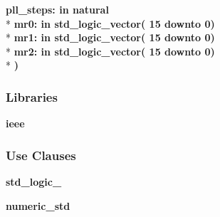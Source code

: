 \begin{DoxyCompactItemize}
{\bfseries \textcolor{vhdlchar}{pll\+\_\+steps\+: }\textcolor{stringliteral}{in }{\bfseries \textcolor{comment}{natural}\textcolor{vhdlchar}{ }}}\\*
{\bfseries \textcolor{vhdlchar}{mr0\+: }\textcolor{stringliteral}{in }\textcolor{vhdlchar}{std\+\_\+logic\+\_\+vector( 15 downto  0)}}\\*
{\bfseries \textcolor{vhdlchar}{mr1\+: }\textcolor{stringliteral}{in }\textcolor{vhdlchar}{std\+\_\+logic\+\_\+vector( 15 downto  0)}}\\*
{\bfseries \textcolor{vhdlchar}{mr2\+: }\textcolor{stringliteral}{in }\textcolor{vhdlchar}{std\+\_\+logic\+\_\+vector( 15 downto  0)}}\\*
{\bfseries  )} 
\end{DoxyCompactItemize}
\subsubsection*{Libraries}
 \begin{DoxyCompactItemize}
\item 
{\bf ieee} 
\end{DoxyCompactItemize}
\subsubsection*{Use Clauses}
 \begin{DoxyCompactItemize}
\item 
{\bf std\+\_\+logic\+\_}   
\item 
{\bf numeric\+\_\+std}   
\end{DoxyCompactItemize}
